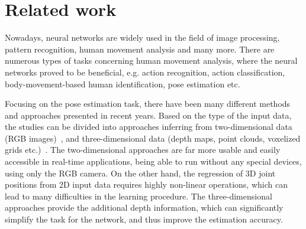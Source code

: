 
\chapter{Related work}\label{chap:related work}

Nowadays, neural networks are widely used in the field of image processing, pattern recognition, human movement analysis and many more. There are numerous types of tasks concerning human movement analysis, where the neural networks proved to be beneficial, e.g. action recognition, action classification, body-movement-based human identification, pose estimation etc.\par
\vspace{5mm}
\noindent Focusing on the pose estimation task, there have been many different methods and approaches presented in recent years. Based on the type of the input data, the studies can be divided into approaches inferring from two-dimensional data (RGB images)~\cite{DBLP:journals/corr/ChouCC17,mono-3dhp2017,VNect_SIGGRAPH2017,DBLP:journals/corr/abs-1907-00837,DBLP:journals/corr/NewellYD16,lcrnet,DBLP:journals/corr/abs-1902-09212}, and three-dimensional data (depth maps, point clouds, voxelized grids etc.)~\cite{Ali19,8100085,DBLP:journals/corr/GeLYT16,haque2016viewpoint,10.1016/j.patrec.2013.09.021,DBLP:journals/corr/abs-1711-07399,Shafaei16,5995316,6126310}. The two-dimensional approaches are far more usable and easily accessible in real-time applications, being able to run without any special devices, using only the RGB camera. On the other hand, the regression of 3D joint positions from 2D input data requires highly non-linear operations, which can lead to many difficulties in the learning procedure. The three-dimensional approaches provide the additional depth information, which can significantly simplify the task for the network, and thus improve the estimation accuracy.

